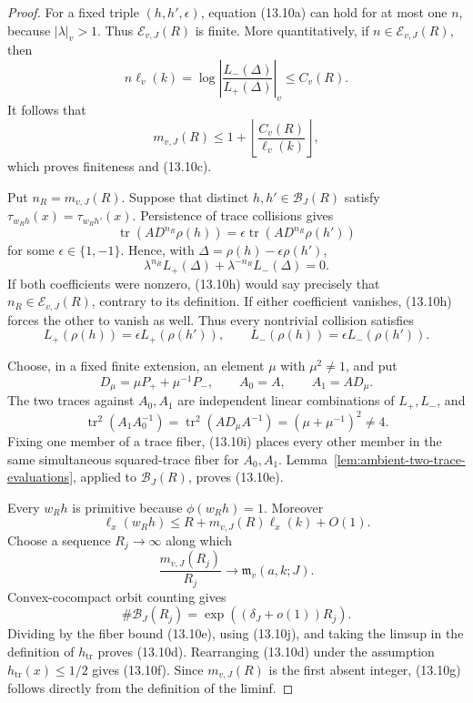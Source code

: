 \documentclass[11pt,reqno]{amsart}
\theoremstyle{definition}
\theoremstyle{remark}
\newcommand{\Tr}{\operatorname{tr}}
\begin{document}
\begin{proof}
For a fixed triple \((h,h',\epsilon)\), equation (13.10a) can hold for at
most one \(n\), because \(|\lambda|_v>1\).  Thus
\(\mathcal E_{v,J}(R)\) is finite.  More quantitatively, if
\(n\in\mathcal E_{v,J}(R)\), then
\[
 n\ell_v(k)
 =
 \log\left|
 \frac{L_-(\Delta)}{L_+(\Delta)}
 \right|_v
 \le C_v(R).
\]
It follows that
\[
 m_{v,J}(R)
 \le
 1+\left\lfloor\frac{C_v(R)}{\ell_v(k)}\right\rfloor,
\]
which proves finiteness and (13.10c).

Put \(n_R=m_{v,J}(R)\).  Suppose that distinct
\(h,h'\in\mathcal B_J(R)\) satisfy
\(\tau_{w_Rh}(x)=\tau_{w_Rh'}(x)\).  Persistence of trace collisions gives
\[
 \Tr(AD^{n_R}\rho(h))
 =\epsilon\Tr(AD^{n_R}\rho(h'))
\]
for some \(\epsilon\in\{1,-1\}\).  Hence, with
\(\Delta=\rho(h)-\epsilon\rho(h')\),
\[
 \lambda^{n_R}L_+(\Delta)
 +\lambda^{-n_R}L_-(\Delta)=0.
\tag{13.10h}
\]
If both coefficients were nonzero, (13.10h) would say precisely that
\(n_R\in\mathcal E_{v,J}(R)\), contrary to its definition.  If either
coefficient vanishes, (13.10h) forces the other to vanish as well.  Thus
every nontrivial collision satisfies
\[
 L_+(\rho(h))=\epsilon L_+(\rho(h')),
 \qquad
 L_-(\rho(h))=\epsilon L_-(\rho(h')).
\tag{13.10i}
\]

Choose, in a fixed finite extension, an element \(\mu\) with
\(\mu^2\ne1\), and put
\[
 D_\mu=\mu P_++\mu^{-1}P_-,
 \qquad A_0=A,\qquad A_1=AD_\mu.
\]
The two traces against \(A_0,A_1\) are independent linear combinations of
\(L_+,L_-\), and
\[
 \Tr^2(A_1A_0^{-1})
 =\Tr^2(AD_\mu A^{-1})
 =(\mu+\mu^{-1})^2\ne4.
\]
Fixing one member of a trace fiber, (13.10i) places every other member in
the same simultaneous squared-trace fiber for \(A_0,A_1\).
Lemma~\ref{lem:ambient-two-trace-evaluations}, applied to
\(\mathcal B_J(R)\), proves (13.10e).

Every \(w_Rh\) is primitive because \(\phi(w_Rh)=1\).  Moreover
\[
 \ell_x(w_Rh)
 \le R+m_{v,J}(R)\ell_x(k)+O(1).
\tag{13.10j}
\]
Choose a sequence \(R_j\to\infty\) along which
\[
 \frac{m_{v,J}(R_j)}{R_j}
 \longrightarrow \mathfrak m_v(a,k;J).
\]
Convex-cocompact orbit counting gives
\[
 \#\mathcal B_J(R_j)=\exp((\delta_J+o(1))R_j).
\]
Dividing by the fiber bound (13.10e), using (13.10j), and taking the limsup
in the definition of \(h_{\Tr}\) proves (13.10d).  Rearranging (13.10d)
under the assumption \(h_{\Tr}(x)\le1/2\) gives (13.10f).  Since
\(m_{v,J}(R)\) is the first absent integer, (13.10g) follows directly from
the definition of the liminf.
\end{proof}
\end{document}
